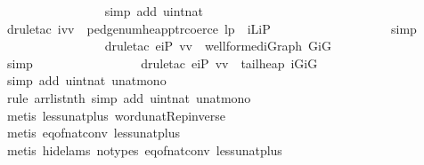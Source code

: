 \begin{isabellebody}
\ \ \ \ \ \ \ \ \ \ \ \ \ \ \ \isamarkupfalse%
\ {\isacharparenleft}simp\ add{\isacharcolon}\ uint{\isacharunderscore}nat{\isacharparenright}\isanewline
\ \ \ \ \ \ \ \ \ \ \ \ \ \ \ \isamarkupfalse%
\ {\isacharparenleft}drule{\isacharunderscore}tac\ i{\isacharequal}vv\ \ pedge{\isacharunderscore}num{\isacharunderscore}heap{\isacharunderscore}ptr{\isacharunderscore}coerce{\isacharbrackleft}\ l{\isacharequal}p\ \ iL{\isacharequal}iP{\isacharbrackright}{\isacharparenright}\isanewline
\ \ \ \ \ \ \ \ \ \ \ \ \ \ \ \ \ \isamarkupfalse%
\ simp{\isacharplus}\isanewline
\ \ \ \ \ \ \ \ \ \ \ \ \ \ \ \isamarkupfalse%
\ {\isacharparenleft}drule{\isacharunderscore}tac\ e{\isacharequal}{\isachardoublequoteopen}iP\ vv{\isachardoublequoteclose}\ \ wellformed{\isacharunderscore}iGraph{\isacharbrackleft}\ G{\isacharequal}iG{\isacharbrackright}{\isacharparenright}\isanewline
\ \ \ \ \ \ \ \ \ \ \ \ \ \ \ \ \isamarkupfalse%
\ simp{\isacharplus}\isanewline
\ \ \ \ \ \ \ \ \ \ \ \ \ \ \ \isamarkupfalse%
\ {\isacharparenleft}drule{\isacharunderscore}tac\ e{\isacharequal}{\isachardoublequoteopen}iP\ vv{\isachardoublequoteclose}\ \ tail{\isacharunderscore}heap{\isacharbrackleft}\ iG{\isacharequal}iG{\isacharbrackright}{\isacharparenright}\isanewline
\ \ \ \ \ \ \ \ \ \ \ \ \ \ \ \ \isamarkupfalse%
\ {\isacharparenleft}simp\ add{\isacharcolon}\ uint{\isacharunderscore}nat\ unat{\isacharunderscore}mono{\isacharparenright}{\isacharplus}\isanewline
\ \ \ \ \ \ \ \ \ \ \ \ \ \ \isamarkupfalse%
\ {\isacharparenleft}rule\ arrlist{\isacharunderscore}nth{\isacharcomma}\ {\isacharparenleft}simp\ add{\isacharcolon}\ uint{\isacharunderscore}nat\ unat{\isacharunderscore}mono{\isacharparenright}{\isacharplus}{\isacharparenright}{\isacharplus}\isanewline
\ \ \ \ \ \ \ \ \ \ \isamarkupfalse%
\ {\isacharparenleft}metis\ less{\isacharunderscore}unat{\isacharunderscore}plus{}\ word{\isacharunderscore}unat{\isachardot}Rep{\isacharunderscore}inverse{\isacharparenright}\isanewline
\ \ \ \ \ \ \ \ \ \isamarkupfalse%
\ {\isacharparenleft}metis\ eq{\isacharunderscore}of{\isacharunderscore}nat{\isacharunderscore}conv\ less{\isacharunderscore}unat{\isacharunderscore}plus{}{\isacharparenright}\isanewline
\ \ \ \ \ \ \ \ \isamarkupfalse%
\ {\isacharparenleft}metis\ {\isacharparenleft}hide{\isacharunderscore}lams{\isacharcomma}\ no{\isacharunderscore}types{\isacharparenright}\ eq{\isacharunderscore}of{\isacharunderscore}nat{\isacharunderscore}conv\ less{\isacharunderscore}unat{\isacharunderscore}plus{}{\isacharparenright}\isanewline

\end{isabellebody}
